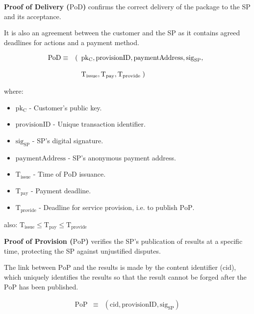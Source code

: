 \documentclass[pdftex,twocolumn,epjc3]{svjour3}
\begin{document}
{\noindent \textbf{Proof of Delivery ($\mathrm{PoD}$)}\label{proof-of-delivery} confirms the correct delivery of the package to the SP and its acceptance.

It is also an agreement between the customer and the SP as it contains agreed deadlines for actions and a payment method.

\begin{eqnarray}
\mathrm{PoD} & \equiv & (\begin{array}[t]{l}\mathrm{pk_C}, \mathrm{provisionID},   \mathrm{paymentAddress},
\mathrm{sig}_\mathrm{SP}, \\\\ 
\mathrm{T}_\mathrm{issue}, \mathrm{T}_\mathrm{pay}, \mathrm{T}_\mathrm{provide}\; )\end{array}
\end{eqnarray}

where:
\begin{itemize}
\item $\mathrm{pk_C}$ - Customer's public key.
\item $\mathrm{provisionID}$ - Unique transaction identifier.
\item $\mathrm{sig}_\mathrm{SP}$ - SP's digital signature.
\item $\mathrm{paymentAddress}$ - SP's anonymous payment address.
\item $\mathrm{T}_\mathrm{issue}$ - Time of $\mathrm{PoD}$ issuance.
\item $\mathrm{T}_\mathrm{pay}$ - Payment deadline.
\item $\mathrm{T}_\mathrm{provide}$ - Deadline for service provision, i.e. to publish $\mathrm{PoP}$.
\end{itemize}

also:
\(\mathrm{T}_\mathrm{issue} \leq \mathrm{T}_\mathrm{pay} \leq \mathrm{T}_\mathrm{provide}\)

\noindent \textbf{Proof of Provision ($\mathrm{PoP}$)}\label{proof-of-provision} verifies the SP's publication of results at a specific time, protecting the SP against unjustified disputes.

The link between $\mathrm{PoP}$ and the results is made by the content identifier ($\mathrm{cid}$), which uniquely identifies the results so that the result cannot be forged after the $\mathrm{PoP}$ has been published.


\begin{eqnarray}
\mathrm{PoP} & \equiv & (\mathrm{cid}, \mathrm{provisionID}, \mathrm{sig}_\mathrm{SP})
\end{eqnarray}

}
\end{document}
